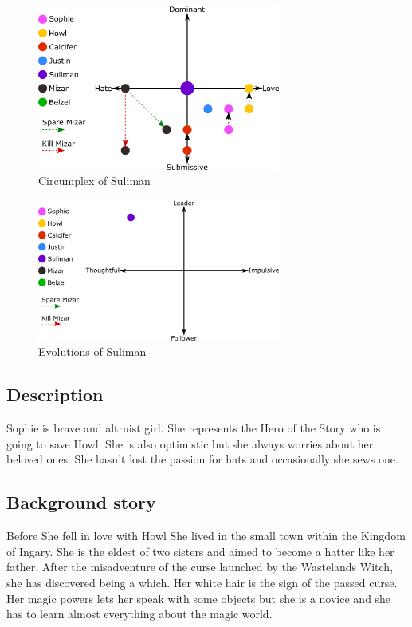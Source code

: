 \begin{figure}[H]
  \centering
  \includegraphics[width=8cm]{Images/Circumplexes/sulimanCircumplex}
  \caption{Circumplex of Suliman}
\end{figure}

\begin{figure}[H]
  \centering
  \includegraphics[width=8cm]{Images/Evolutions/sulimanEvolution}
  \caption{Evolutions of Suliman}
\end{figure}

\subsection{Description}
Sophie is brave and altruist girl. She represents the Hero of the Story who is going to save Howl. She is also optimistic but she always worries about her beloved ones. She hasn’t lost the passion for hats and occasionally she sews one.

\subsection{Background story}
Before She fell in love with Howl She lived in the small town within the Kingdom of Ingary. She is the eldest of two sisters and aimed to become a hatter like her father. After the misadventure of the curse launched by the Wastelands Witch, she has discovered being a which. Her white hair is the sign of the passed curse. Her magic powers lets her speak with some objects but she is a novice and she has to learn almost everything about the magic world.
